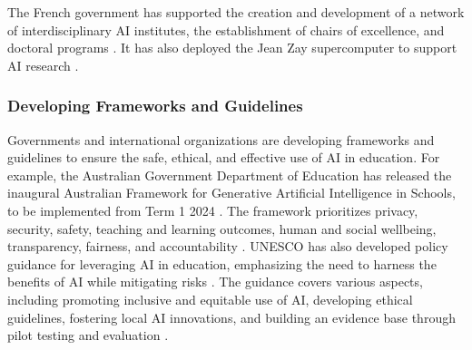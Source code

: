 \documentclass{article}
\begin{document}
The French government has supported the creation and development of a network of interdisciplinary AI institutes, the establishment of chairs of excellence, and doctoral programs \cite{https://www.entreprises.gouv.fr/fr/numerique/enjeux/la-strategie-nationale-pour-l-ia} \cite{https://www.enseignementsup-recherche.gouv.fr/fr/la-strategie-france-ia-soutenir-la-dynamique-francaise-autour-de-l-intelligence-artificielle-46305}. It has also deployed the Jean Zay supercomputer to support AI research \cite{https://www.entreprises.gouv.fr/fr/numerique/enjeux/la-strategie-nationale-pour-l-ia}.




\subsubsection{Developing Frameworks and Guidelines}
Governments and international organizations are developing frameworks and guidelines to ensure the safe, ethical, and effective use of AI in education. For example, the Australian Government Department of Education has released the inaugural Australian Framework for Generative Artificial Intelligence in Schools, to be implemented from Term 1 2024 \cite{https://www.educationmattersmag.com.au/federal-government-releases-first-ai-framework-for-schools/}. The framework prioritizes privacy, security, safety, teaching and learning outcomes, human and social wellbeing, transparency, fairness, and accountability \cite{https://www.educationmattersmag.com.au/federal-government-releases-first-ai-framework-for-schools/}.
UNESCO has also developed policy guidance for leveraging AI in education, emphasizing the need to harness the benefits of AI while mitigating risks \cite{https://www.teachingtomorrow.co.uk/news/artificial-intelligence-in-education-empowering-teachers-and-students}. The guidance covers various aspects, including promoting inclusive and equitable use of AI, developing ethical guidelines, fostering local AI innovations, and building an evidence base through pilot testing and evaluation \cite{https://www.teachingtomorrow.co.uk/news/artificial-intelligence-in-education-empowering-teachers-and-students}.
\end{document}
